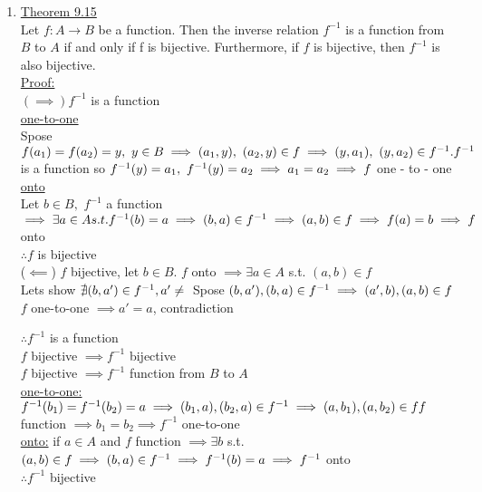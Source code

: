 \documentclass[12pt]{amsart}
\begin{document}
\begin{enumerate}
\item \underline{Theorem 9.15}\\
Let $f: A \rightarrow B$ be a function. Then the inverse relation $f^{-1}$ is a function from $B$ to $A$ if and only if f is bijective. Furthermore, if $f$ is bijective, then $f^{-1}$ is also bijective.\\
\underline{Proof:}\\
$(\implies ) f^{-1}$ is a function\\
\underline{one-to-one}\\
Spose $f(a_1) = f(a_2) = y,\,\, y \in B \implies (a_1,y),\,\, (a_2,y) \in f\\
\implies (y,a_1),\,\,(y,a_2) \in f^{-1}. f^{-1}$ is a function so $f^{-1}(y) = a_1,\,\, f^{-1}(y) = a_2 \implies a_1 = a_2\\
\implies f$ one - to - one\\
\underline{onto}\\
Let $b \in B,\,\, f^{-1}$ a function $\implies \exists a \in A s.t. f^{-1}(b) = a\\
\implies (b,a) \in f^{-1} \implies (a,b) \in f \implies f(a) = b\\
\implies f$ onto\\
$\therefore f$ is bijective\\
($\impliedby$) $f$ bijective, let $b \in B$. $f$ onto $\implies \exists a \in A$ s.t. $(a,b) \in f$\\
Lets show $\nexists (b,a') \in f^{-1}, a' \neq \\$
Spose $(b,a'),(b,a) \in f^{-1} \implies (a',b),(a,b) \in f\\$
$f$ one-to-one $\implies a' = a$, contradiction\

$\therefore f^{-1}$ is a function\\
$f$ bijective $\implies f^{-1}$ bijective\\
$f$ bijective $\implies f^{-1}$ function from $B$ to $A$\\
\underline{one-to-one:} $f^{-1} (b_1) = f^{-1} (b_2) = a\\
\implies (b_1,a),(b_2,a) \in f^{-1} \implies (a,b_1),(a,b_2) \in f\\
f$ function $\implies b_1 = b_2 \implies f^{-1}$ one-to-one\\
\underline{onto:} if $a \in A$ and $f$ function $\implies \exists b$ s.t. $(a,b) \in f\\
\implies (b,a) \in f^{-1} \implies f^{-1}(b) = a \implies f^{-1}$ onto\\
$\therefore f^{-1}$ bijective\\



\end{enumerate}
\end{document}
